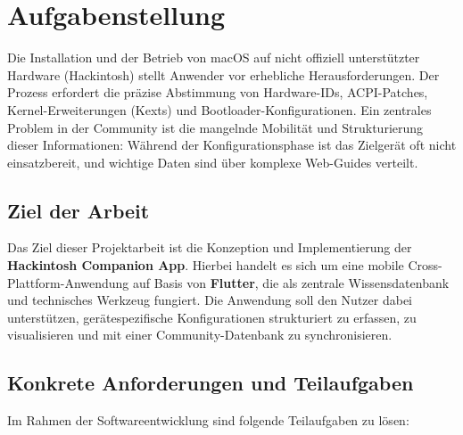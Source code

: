 \chapter{Aufgabenstellung} %
\label{sec:aufgabenstellung}

Die Installation und der Betrieb von macOS auf nicht offiziell unterstützter Hardware (Hackintosh) stellt Anwender vor erhebliche Herausforderungen. Der Prozess erfordert die präzise Abstimmung von Hardware-IDs, ACPI-Patches, Kernel-Erweiterungen (Kexts) und Bootloader-Konfigurationen. Ein zentrales Problem in der Community ist die mangelnde Mobilität und Strukturierung dieser Informationen: Während der Konfigurationsphase ist das Zielgerät oft nicht einsatzbereit, und wichtige Daten sind über komplexe Web-Guides verteilt.

\section{Ziel der Arbeit}
Das Ziel dieser Projektarbeit ist die Konzeption und Implementierung der \textbf{Hackintosh Companion App}. Hierbei handelt es sich um eine mobile Cross-Plattform-Anwendung auf Basis von \textbf{Flutter}, die als zentrale Wissensdatenbank und technisches Werkzeug fungiert. Die Anwendung soll den Nutzer dabei unterstützen, gerätespezifische Konfigurationen strukturiert zu erfassen, zu visualisieren und mit einer Community-Datenbank zu synchronisieren.

\section{Konkrete Anforderungen und Teilaufgaben}
Im Rahmen der Softwareentwicklung sind folgende Teilaufgaben zu lösen:


